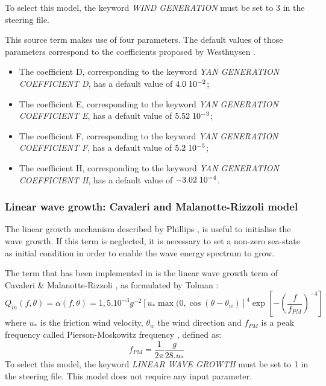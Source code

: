  To select this model, the keyword \textit{WIND GENERATION} must be set to 3 in the steering file.

 This source term makes use of four parameters. The default values of those parameters correspond to the coefficients proposed by Westhuysen \cite{Westhuys2007}.

\begin{itemize}
\item  The coefficient D, corresponding to the keyword \textit{YAN GENERATION COEFFICIENT D}, has a default value of $4.0\hspace{0.1cm} 10^{-2}$;
\item  The coefficient E, corresponding to the keyword \textit{YAN GENERATION COEFFICIENT E}, has a default value of $5.52\hspace{0.1cm} 10^{-3}$;
\item  The coefficient F, corresponding to the keyword \textit{YAN GENERATION COEFFICIENT F}, has a default value of $5.2\hspace{0.1cm} 10^{-5}$;
\item  The coefficient H, corresponding to the keyword \textit{YAN GENERATION COEFFICIENT H}, has a default value of $-3.02\hspace{0.1cm} 10^{-4}$.
\end{itemize}

\subsubsection{Linear wave growth: Cavaleri and Malanotte-Rizzoli model}
\label{parag4.3.2.4}

 The linear growth mechanism described by Phillips \cite{Phillips1957}, \cite{Phillips1958} is useful to initialise the wave growth. If this term is neglected, it is necessary to set a non-zero sea-state as initial condition in order to enable the wave energy spectrum to grow.

 The term that has been implemented in \tomawac is the linear wave growth term of Cavaleri \& Malanotte-Rizzoli \cite{Cavaleri1981}, as formulated by Tolman \cite{Tolman1992}:
\begin{equation} \label{GrindEQ__4_35_}
Q_{in} (f,\theta )=\alpha (f,\theta )=1,5.10^{-3} g^{-2} \left[u_{*} \max (0,\cos \left(\theta -\theta _{w} \right)\right]^{4} \exp \left[-\left(\frac{f}{f_{PM} } \right)^{-4} \right]
\end{equation}
where $u_{*}$ is the friction wind velocity, ${\theta}_{w}$ the wind direction and ${f}_{PM}$ is a peak frequency called Pierson-Moskowitz frequency \cite{Pierson1964}, defined as:
\begin{equation} \label{GrindEQ__4_36_}
f_{PM} =\frac{1}{2\pi } \frac{g}{28.u_{*} }
\end{equation}
To select this model, the keyword \textit{LINEAR WAVE GROWTH} must be set to 1 in the steering file. This model does not require any input parameter.

